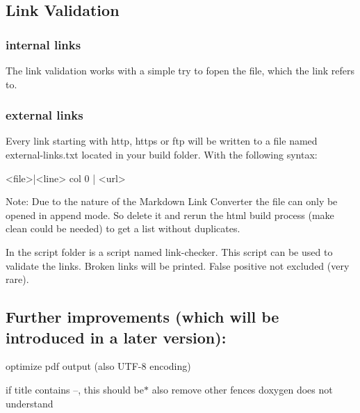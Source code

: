 \subsection*{Link Validation}

\subsubsection*{internal links}

The link validation works with a simple try to {\ttfamily fopen} the file, which the link refers to.

\subsubsection*{external links}

Every link starting with {\ttfamily http}, {\ttfamily https} or {\ttfamily ftp} will be written to a file named {\ttfamily external-\/links.\+txt} located in your build folder. With the following syntax\+: \begin{DoxyVerb}    <file>|<line> col 0 | <url>
\end{DoxyVerb}


Note\+: Due to the nature of the Markdown Link Converter the file can only be opened in append mode. So delete it and rerun the html build process ({\ttfamily make clean} could be needed) to get a list without duplicates.

In the script folder is a script named {\ttfamily link-\/checker}. This script can be used to validate the links. Broken links will be printed. False positive not excluded (very rare).

\subsection*{Further improvements (which will be introduced in a later version)\+:}


\begin{DoxyItemize}
\item optimize pdf output (also U\+T\+F-\/8 encoding)
\item if title contains --, this should be$\ast$ also remove other fences doxygen does not understand 
\end{DoxyItemize}